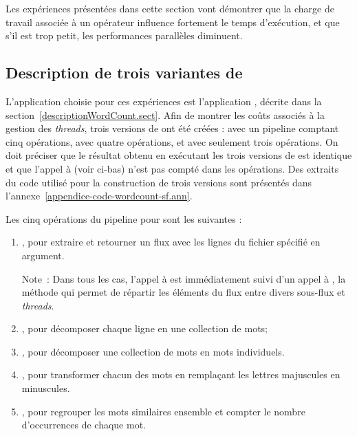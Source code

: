 Les exp\'eriences présentées dans cette section vont d\'emontrer que la charge de travail associée à un opérateur influence fortement le temps d'ex\'ecution, et que s'il est trop petit, les performances parallèles diminuent.


\subsection{Description de trois variantes de }

L'application choisie pour ces exp\'eriences est l'application , d\'ecrite dans la section~\ref{descriptionWordCount.sect}. Afin de montrer les coûts associés à la gestion des \emph{threads}, trois versions de  ont \'et\'e cr\'e\'ees :  avec un pipeline comptant cinq op\'erations,  avec quatre opérations, et  avec seulement trois op\'erations. On doit pr\'eciser que le r\'esultat obtenu en ex\'ecutant les trois versions de  est identique et que l'appel à  (voir ci-bas) n'est pas compté dans les opérations. Des extraits du code utilis\'e pour la construction de trois versions sont pr\'esent\'es dans l'annexe~\ref{appendice-code-wordcount-sf.ann}. 

\goodbreak
Les cinq op\'erations du pipeline pour  sont les suivantes :
\begin{enumerate}
\item {}, pour extraire et retourner un flux avec les lignes du fichier sp\'ecifi\'e en argument.

Note~: Dans tous les cas, l'appel à  est immédiatement suivi d'un appel à , la m\'ethode qui permet de r\'epartir les \'el\'ements du flux entre divers sous-flux et \emph{threads}.

\item {}, pour d\'ecomposer chaque ligne en une collection de mots;

\item {}, pour d\'ecomposer une collection de mots en mots individuels.

\item {}, pour transformer chacun des mots en rempla\c{c}ant les lettres majuscules en minuscules.

\item {}, pour regrouper les mots similaires ensemble et compter le nombre d'occurrences de chaque mot.
\end{enumerate}

